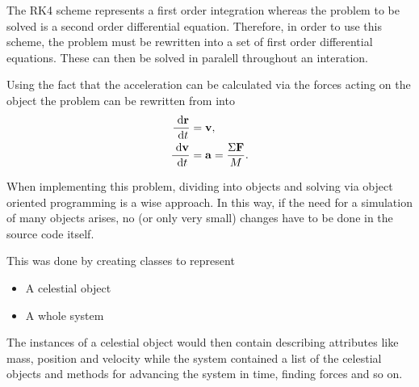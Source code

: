 The RK4 scheme represents a first order integration whereas the
problem to be solved is a second order differential equation.
Therefore, in order to use this scheme, the problem must be
rewritten into a set of first order differential equations. These
can then be solved in paralell throughout an interation.

Using the fact that the acceleration can be calculated via the
forces acting on the object the problem can be rewritten from
 into
\begin{align}
    \frac{\ \mathrm{d}\mathbf{r}}{\ \mathrm{d}t} &= \mathbf{v}, \label{diffSetFirstR} \\
    \frac{\ \mathrm{d}\mathbf{v}}{\ \mathrm{d}t} &= \mathbf{a} = \frac{\Sigma
        \mathbf{F}}{M}.
    \label{diffSetFirstV}
\end{align}

When implementing this problem, dividing into objects and solving
via object oriented programming is a wise approach. In this way, if
the need for a simulation of many objects arises, no (or only very
small) changes have to be done in the source code itself.

This was done by creating classes to represent
\begin{itemize}
    \item A celestial object
    \item A whole system
\end{itemize}
The instances of a celestial object would then contain describing
attributes like mass, position and velocity while the system
contained a list of the celestial objects and methods for advancing
the system in time, finding forces and so on.

